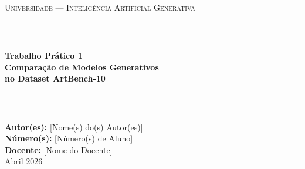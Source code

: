 \documentclass[12pt,a4paper]{article}
\begin{document}
\begin{titlepage}
  \centering
  \vspace*{1.5cm}

  {\scshape\Large Universidade — Inteligência Artificial Generativa\par}
  \vspace{0.5cm}
  \rule{\linewidth}{0.5pt}\\[0.4cm]
  {\huge\bfseries Trabalho Prático 1\\[0.3em]
  Comparação de Modelos Generativos\\no Dataset ArtBench-10\par}
  \rule{\linewidth}{0.5pt}\\[1.5cm]

  {\large
  \textbf{Autor(es):} [Nome(s) do(s) Autor(es)]\\[0.3em]
  \textbf{Número(s):} [Número(s) de Aluno]\\[0.3em]
  \textbf{Docente:} [Nome do Docente]\\[1.5cm]
  Abril 2026\par}

  \vfill
\end{titlepage}

\begin{abstract}
\noindent
Este relatório descreve o desenvolvimento e avaliação comparativa de três modelos
generativos de imagens — Autoencoder Variacional (VAE), Rede Adversarial Convolucional
Profunda (DCGAN) e Modelo de Difusão por Desruído por Pontuação (DDPM) — treinados
no dataset completo ArtBench-10 (50\,000 imagens de treino, 32$\times$32 píxeis,
10 estilos artísticos). A avaliação quantitativa baseia-se nas métricas
\textit{Fréchet Inception Distance} (FID) e \textit{Kernel Inception Distance} (KID),
calculadas para 10 sementes aleatórias com 5\,000 amostras geradas por modelo.
O DCGAN obteve o melhor desempenho (FID\,=\,$30{,}46\pm 0{,}57$;
KID\,=\,$0{,}0032\pm 0{,}0001$), seguido pelo DDPM
(FID\,=\,$37{,}91\pm 0{,}37$; KID\,=\,$0{,}0062\pm 0{,}0002$) e pelo VAE
(FID\,=\,$140{,}37\pm 0{,}43$; KID\,=\,$0{,}0314\pm 0{,}0004$). Os resultados
demonstram que, para imagens de baixa resolução (32$\times$32), um GAN bem afinado
pode superar métricas de modelos de difusão com amostragem DDIM acelerada,
embora visualmente o DDPM exiba maior diversidade de conteúdo.
\end{abstract}
\end{document}
